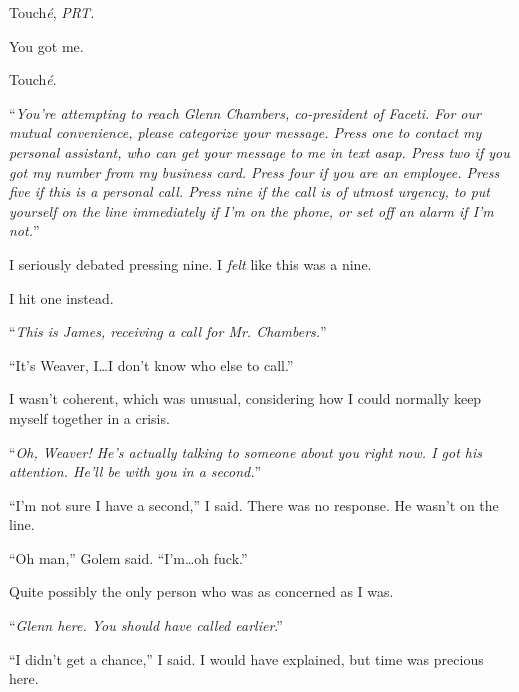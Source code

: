 





Touch\emph{\'{e}}, \emph{PRT.  }



You got me.



Touch\emph{\'{e}}.



``\emph{You're attempting to reach Glenn Chambers, co-president of Faceti.  For our mutual convenience, please categorize your message.  Press one to contact my personal assistant, who can get your message to me in text asap.  Press two if you got my number from my business card.  Press four if you are an employee.  Press five if this is a personal call.  Press nine if the call is of utmost urgency, to put yourself on the line immediately if I'm on the phone, or set off an alarm if I'm not.}''



I seriously debated pressing nine.  I \emph{felt} like this was a nine.



I hit one instead.



``\emph{This is James, receiving a call for Mr. Chambers.}''



``It's Weaver, I\ldots I don't know who else to call.''



I wasn't coherent, which was unusual, considering how I could normally keep myself together in a crisis.



``\emph{Oh, Weaver!  He's actually talking to someone about you right now.  I got his attention.  He'll be with you in a second.}''



``I'm not sure I have a second,'' I said.  There was no response.  He wasn't on the line.



``Oh man,'' Golem said.  ``I'm\ldots oh fuck.''



Quite possibly the only person who was as concerned as I was.



``\emph{Glenn here.  You should have called earlier}.''



``I didn't get a chance,'' I said.  I would have explained, but time was precious here.



